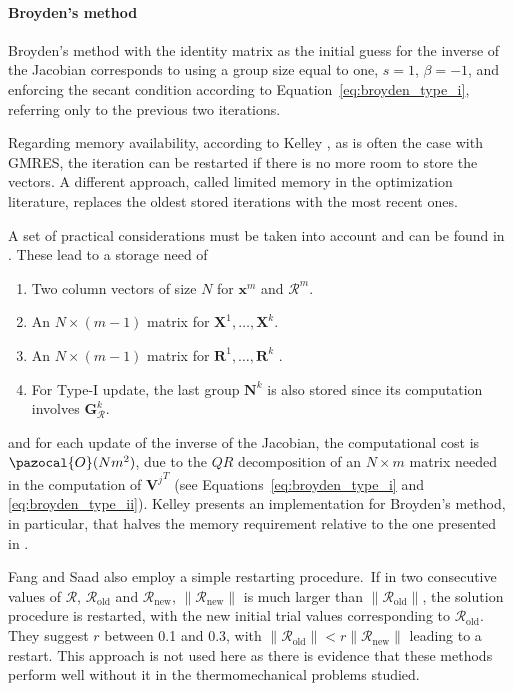           \paragraph{Broyden's method} Broyden's method \citep{broydenClassMethodsSolving1965a} with the identity matrix as the initial guess for the inverse of the Jacobian corresponds to using a group size equal to one, \(s=1\), \(\beta=-1\), and enforcing the secant condition according to Equation~\eqref{eq:broyden_type_i}, referring only to the previous two iterations.

          Regarding memory availability, according to Kelley \citep{kelley_solving_2003}, as is often the case with GMRES, the iteration can be restarted if there is no more room to store the vectors.
          A different approach, called limited memory in the optimization literature, replaces the oldest stored iterations with the most recent ones.

          A set of practical considerations must be taken into account and can be found in \cite{fang_two_2009}.
          These lead to a storage need of
          \begin{enumerate}
          \item  Two column vectors of size \(N\) for \(\mathbf{x}^{m}\) and \(\bm{\mathcal{R}}^{m}\).
          \item An \(N \times(m-1)\) matrix for \(\mathbf{X}^{1}, \ldots, \mathbf{X}^{k}\).
          \item An \(N \times(m-1)\) matrix for \(\mathbf{R}^{1}, \ldots, \mathbf{R}^{k}\) .
          \item For Type-I update, the last group \(\mathbf N^{k}\) is also stored since its computation involves \(\mathbf{G}_{\bm{\mathcal{R}}}^{k}\).
          \end{enumerate}
          and for each update of the inverse of the Jacobian, the computational cost is \(\pazocal{O}(Nm^2)\), due to the \(QR\) decomposition of an \(N\times m\) matrix needed in the computation of \({\mathbf V^j}^T\) (see Equations~\eqref{eq:broyden_type_i} and \eqref{eq:broyden_type_ii}).
          Kelley \citep{kelley_solving_2003} presents an implementation for Broyden's method, in particular, that halves the memory requirement relative to the one presented in \cite{fang_two_2009}.

          Fang and Saad \citep{fang_two_2009} also employ a simple restarting procedure.\
          If in two consecutive values of \(\bm{\mathcal{R}}\), \(\bm{\mathcal{R}}_\text{old}\) and \(\bm{\mathcal{R}}_\text{new}\), \(\|\bm{\mathcal{R}}_\text{new}\|\) is much larger than \(\|\bm{\mathcal{R}}_\text{old}\|\), the solution procedure is restarted, with the new initial trial values corresponding to \(\bm{\mathcal{R}}_\text{old}\).
          They suggest \(r\) between 0.1 and 0.3, with \(\|\bm{\mathcal{R}}_\text{old}\| < r\|\bm{\mathcal{R}}_\text{new}\|\) leading to a restart.
          This approach is not used here as there is evidence that these methods perform well without it in the thermomechanical problems studied.



